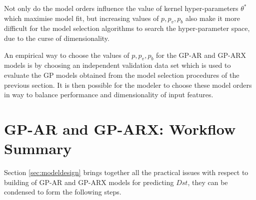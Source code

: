 \documentclass{article}
\begin{document}
Not only do the model orders influence the value of kernel hyper-parameters $\theta^*$ which maximise model fit, but increasing values of $p, p_v, p_b$ also make it more difficult for the model selection algorithms to search the hyper-parameter space, due to the curse of dimensionality.

An empirical way to choose the values of $p, p_v, p_b$ for the GP-AR and GP-ARX models is by choosing an independent validation data set which is used to evaluate the GP models obtained from the model selection procedures of the previous section. It is then possible for the modeler to choose these model orders in way to balance performance and dimensionality of input features.

\section{GP-AR and GP-ARX: Workflow Summary}

Section \ref{sec:modeldesign} brings together all the practical issues with respect to building of GP-AR and GP-ARX models for predicting $Dst$, they can be condensed to form the following steps.
\end{document}

